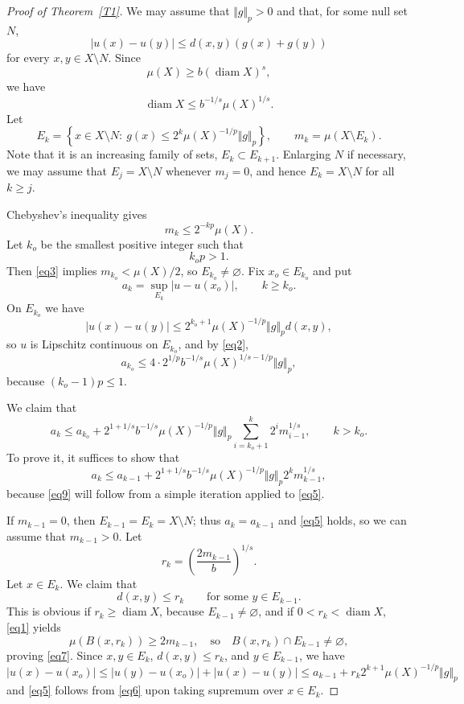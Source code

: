 \documentclass[12pt,leqno]{amsart}
\theoremstyle{definition}
\def\diam{\operatorname{diam}}
\numberwithin{theorem}{section} \numberwithin{equation}{section}
\begin{document}
\begin{proof}[Proof of Theorem~\ref{T1}]
We may assume that $\Vert g\Vert_p>0$ and that, for some null set $N$,
\[
 |u(x)-u(y)|\leq d(x,y)(g(x)+g(y))
\]
for every $x,y\in X\setminus N$. Since
\[
 \mu(X)\ge b(\diam X)^s,
\]
we have
\begin{equation}
\label{eq2}
\diam X\leq b^{-1/s}\mu(X)^{1/s}.
\end{equation}
Let
\[
 E_k=\left\{x\in X\setminus N:\ g(x)\leq 2^k\mu(X)^{-1/p}\Vert g\Vert_p\right\},
 \qquad
 m_k=\mu(X\setminus E_k).
\]
Note that it is an increasing family of sets, $E_k\subset E_{k+1}$.
Enlarging $N$ if necessary, we may assume that $E_j=X\setminus N$ whenever $m_j=0$, and hence $E_k=X\setminus N$ for all $k\geq j$.

Chebyshev's inequality gives
\begin{equation}
\label{eq3}
m_k\leq 2^{-kp}\mu(X).
\end{equation}
Let $k_o$ be the smallest positive integer such that
\[
 k_op>1.
\]
Then \eqref{eq3} implies $m_{k_o}<\mu(X)/2$, so $E_{k_o}\ne\varnothing$. Fix $x_o\in E_{k_o}$ and put
\[
 a_k=\sup_{E_k}|u-u(x_o)|,
 \qquad k\ge k_o.
\]
On $E_{k_o}$ we have
\[
 |u(x)-u(y)|\leq 2^{k_o+1}\mu(X)^{-1/p}\Vert g\Vert_p d(x,y),
\]
so $u$ is Lipschitz continuous on $E_{k_o}$, and by \eqref{eq2},
\begin{equation}
\label{eq4}
a_{k_o}
\leq 4\cdot 2^{1/p} b^{-1/s}\mu(X)^{1/s-1/p}\Vert g\Vert_p,
\end{equation}
because $(k_o-1)p\leq 1$.

We claim that 
\begin{equation}
\label{eq9}
a_k\leq a_{k_o}
+2^{1+1/s}b^{-1/s}\mu(X)^{-1/p}\Vert g\Vert_p\sum_{i=k_o+1}^k 2^im_{i-1}^{1/s},
\qquad
k> k_o.
\end{equation}
To prove it, it suffices to show that
\begin{equation}
\label{eq5}
a_k\leq a_{k-1}
+2^{1+1/s}b^{-1/s}\mu(X)^{-1/p}\Vert g\Vert_p 2^km_{k-1}^{1/s},
\end{equation}
because \eqref{eq9} will follow from a simple iteration applied to \eqref{eq5}.

If $m_{k-1}=0$, then $E_{k-1}=E_k=X\setminus N$; thus $a_k=a_{k-1}$ and \eqref{eq5} holds, so we can assume that $m_{k-1}>0$. Let
\begin{equation}
\label{eq6}
 r_k=\left(\frac{2m_{k-1}}b\right)^{1/s}.
\end{equation}
Let $x\in E_k$. We claim that
\begin{equation}
\label{eq7}
d(x,y)\leq r_k
\qquad
\text{for some } y\in E_{k-1}.
\end{equation}
This is obvious if $r_k\geq \diam X$, because $E_{k-1}\neq\varnothing$, and if $0<r_k<\diam X$, \eqref{eq1} yields
\[
\mu(B(x,r_k))\ge 2m_{k-1},
\quad
\text{so}
\quad
B(x,r_k)\cap E_{k-1}\neq\varnothing,
\]
proving \eqref{eq7}.
Since $x,y\in E_k$, $d(x,y)\leq r_k$, and $y\in E_{k-1}$, we have
\[
|u(x)-u(x_o)|\leq |u(y)-u(x_o)|+|u(x)-u(y)|\leq a_{k-1}+r_k2^{k+1}\mu(X)^{-1/p}\Vert g\Vert_p
\]
and \eqref{eq5} follows from \eqref{eq6} upon taking supremum over $x\in E_k$.


\end{proof}
\end{document}
